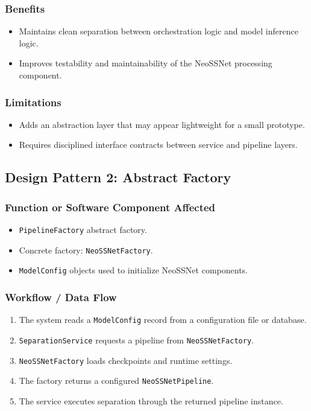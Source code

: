\documentclass[12pt,a4paper]{report}
\begin{document}
\subsubsection*{Benefits}
\begin{itemize}[nosep]
  \item Maintains clean separation between orchestration logic and model inference logic.
  \item Improves testability and maintainability of the NeoSSNet processing component.
\end{itemize}

\subsubsection*{Limitations}
\begin{itemize}[nosep]
  \item Adds an abstraction layer that may appear lightweight for a small prototype.
  \item Requires disciplined interface contracts between service and pipeline layers.
\end{itemize}

\subsection{Design Pattern 2: Abstract Factory}

\subsubsection*{Function or Software Component Affected}
\begin{itemize}[nosep]
  \item \texttt{PipelineFactory} abstract factory.
  \item Concrete factory: \texttt{NeoSSNetFactory}.
  \item \texttt{ModelConfig} objects used to initialize NeoSSNet components.
\end{itemize}

\subsubsection*{Workflow / Data Flow}
\begin{enumerate}[nosep]
  \item The system reads a \texttt{ModelConfig} record from a configuration file or database.
  \item \texttt{SeparationService} requests a pipeline from \texttt{NeoSSNetFactory}.
  \item \texttt{NeoSSNetFactory} loads checkpoints and runtime settings.
  \item The factory returns a configured \texttt{NeoSSNetPipeline}.
  \item The service executes separation through the returned pipeline instance.
\end{enumerate}
\end{document}

